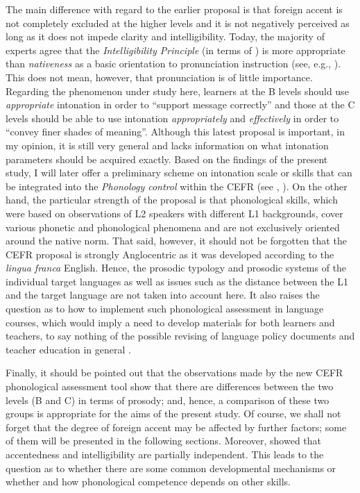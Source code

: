 The main difference with regard to the earlier proposal is that foreign accent is not completely excluded at the higher levels and it is not negatively perceived as long as it does not impede clarity and intelligibility. Today, the majority of experts agree that the \textit{Intelligibility Principle} (in terms of \citealt{Levis2005}) is more appropriate than \textit{nativeness} as a basic orientation to pronunciation instruction (see, e.g., \citealt{Piccardo2016, DerwingMunro2015}). This does not mean, however, that pronunciation is of little importance. Regarding the phenomenon under study here, learners at the B levels should use \textit{appropriate} intonation in order to “support message correctly” and those at the C levels should be able to use intonation \textit{appropriately} and \textit{effectively} in order to “convey finer shades of meaning”. Although this latest proposal is important, in my opinion, it is still very general and lacks information on what intonation parameters should be acquired exactly. Based on the findings of the present study, I will later offer a preliminary scheme on intonation scale or skills that can be integrated into the \textit{Phonology control} within the CEFR (see , ). On the other hand, the particular strength of the proposal is that phonological skills, which were based on observations of L2 speakers with different L1 backgrounds, cover various phonetic and phonological phenomena and are not exclusively oriented around the native norm. That said, however, it should not be forgotten that the CEFR proposal is strongly Anglocentric as it was developed according to the \textit{lingua franca} English. Hence, the prosodic typology and prosodic systems of the individual target languages as well as issues such as the distance between the L1 and the target language are not taken into account here. It also raises the question as to how to implement such phonological assessment in language courses, which would imply a need to develop materials for both learners and teachers, to say nothing of the possible revising of language policy documents and teacher education in general \citep{Piccardo2016}.


Finally, it should be pointed out that the observations made by the new CEFR phonological assessment tool show that there are differences between the two levels (B and C) in terms of prosody; and, hence, a comparison of these two groups is appropriate for the aims of the present study. Of course, we shall not forget that the degree of foreign accent may be affected by further factors; some of them will be presented in the following sections. Moreover, \citet{MunroDerwing1995} showed that accentedness and intelligibility are partially independent. This leads to the question as to whether there are some common developmental mechanisms or whether and how phonological competence depends on other skills.


